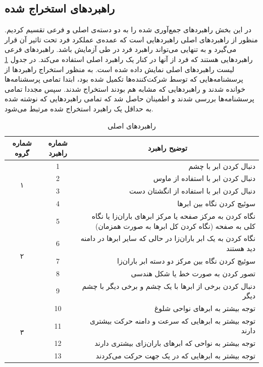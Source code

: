 \documentclass[twoside, a4paper,11pt]{book}
\numberwithin{equation}{chapter}
\numberwithin{table}{chapter}
\numberwithin{figure}{chapter}
\numberwithin{equation}{chapter}
\begin{document}
\subsection{راهبرد‌های استخراج شده}
در این بخش راهبرد‌های جمع‌آوری شده را  به دو دسته‌ی اصلی و فرعی تقسیم  کردیم. منظور از راهبردهای اصلی راهبرد‌هایی است که عمده‌ی عملکرد فرد تحت تاثیر آن قرار می‌گیرد و به تنهایی می‌تواند راهبرد فرد در طی آزمایش باشد. راهبردهای فرعی راهبردهایی هستند که فرد از آنها در کنار یک راهبرد اصلی استفاده می‌کند. در جدول \ref{StrategyList} لیست راهبرد‌های اصلی نمایش داده شده است. به منظور استخراج راهبرد‌ها از پرسشنامه‌هایی که توسط شرکت‌کننده‌ها تکمیل شده بود، ابتدا تمامی پرسشنامه‌ها خوانده شدند و راهبردهایی که مشابه هم بودند استخراج شدند. سپس مجددا تمامی پرسشنامه‌ها بررسی شدند و اطمینان حاصل شد که تمامی راهبرد‌هایی که نوشته شده به حداقل یک راهبرد استخراج شده مرتبط می‌شود. 
\begin{table}[]
	\centering
	\caption{راهبرد‌های اصلی}
	\label{StrategyList}
	\begin{scriptsize}
	\begin{center}
	\renewcommand{\arraystretch}{2}
	\begin{tabular}{|c|c|r|}
		\hline
\textbf{شماره گروه} & \textbf{شماره راهبرد} & \multicolumn{1}{c|}{\textbf{توضیح راهبرد}} \\ \hline
		\multirow{4}{*}{۱} & 1 & دنبال کردن ابر با چشم \\ \cline{2-3} 
		& 2 & دنبال کردن ابر با استفاده از ماوس \\ \cline{2-3} 
		& 3 & دنبال کردن ابر با استفاده از انگشتان دست \\ \cline{2-3} 
		& 4 & سوئیچ کردن نگاه بین ابرها \\ \hline
		\multirow{5}{*}{۲} & 5 & نگاه کردن به مرکز صفحه یا مرکز ابرهای باران‌زا یا نگاه کلی به صفحه (نگاه کردن کل ابرها به صورت همزمان) \\ \cline{2-3} 
		& 6 & نگاه کردن به یک ابر باران‌زا در حالی که سایر ابرها در دامنه دید هستند \\ \cline{2-3} 
		& 7 & سوئیچ کردن نگاه بین مرکز دو دسته ابر باران‌زا \\ \cline{2-3} 
		& 8 & تصور کردن به صورت خط یا شکل هندسی \\ \cline{2-3} 
		& 9 & دنبال کردن برخی از ابرها با یک چشم و برخی دیگر با چشم دیگر \\ \hline
		\multirow{4}{*}{۳} & 10 & توجه بیشتر به ابرهای نواحی شلوغ \\ \cline{2-3} 
		& 11 & توجه بیشتر به ابرهایی که سرعت و دامنه حرکت بیشتری دارند \\ \cline{2-3} 
		& 12 & توجه بیشتر به نواحی که ابرهای باران‌زای بیشتری دارند \\ \cline{2-3} 
		& 13 & توجه بیشتر به ابرهایی که در یک جهت حرکت می‌کردند \\ \hline
	\end{tabular}
	\end{center}
	\end{scriptsize}
\end{table}
\end{document}
